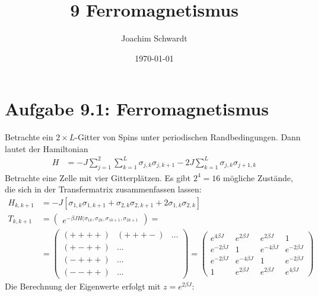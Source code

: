 \documentclass[a4paper,12pt]{article}
\newcommand{\klam}{}
\begin{document}
\title{9 Ferromagnetismus}
\author{Joachim Schwardt}
\date{\today}
\maketitle

\section*{Aufgabe 9.1: Ferromagnetismus}
Betrachte ein $2\times L$-Gitter von Spins unter periodischen Randbedingungen. Dann lautet der Hamiltonian
\begin{align*}
H&=-J\sum_{j=1}^2\sum_{k=1}^L\sigma_{j,k}\sigma_{j,k+1}-2J\sum_{k=1}^L\sigma_{j,k}\sigma_{j+1,k}
\end{align*}
Betrachte eine Zelle mit vier Gitterplätzen. Es gibt $2^4=16$ mögliche Zustände, die sich in der Transfermatrix zusammenfassen lassen:
\begin{align*}
H_{k,k+1}&=-J\klam\left[ {\sigma_{1,k}\sigma_{1,k+1}+\sigma_{2,k}\sigma_{2,k+1}+2\sigma_{1,k}\sigma_{2,k}} \right]\\
T_{k,k+1}&=\begin{pmatrix}
e^{-\beta JH(\sigma_{1k},\sigma_{2k},\sigma_{1k+1},\sigma_{2k+1}}
\end{pmatrix}=\\
&=\begin{pmatrix}
(++++)&(+++-)&\dots\\
(+-++)&\dots\\
(-+++)&\dots\\
(--++)&\dots
\end{pmatrix} =\begin{pmatrix}
e^{4\beta J}&e^{2\beta J}&e^{2\beta J}&1\\
e^{-2\beta J}&1&e^{-4\beta J}&e^{-2\beta J}\\
e^{-2\beta J}&e^{-4\beta J}&1&e^{-2\beta J}\\
1&e^{2\beta J}&e^{2\beta J}&e^{4\beta J}
\end{pmatrix}
\end{align*}
Die Berechnung der Eigenwerte erfolgt mit $z=e^{2\beta J}$:
\end{document}
